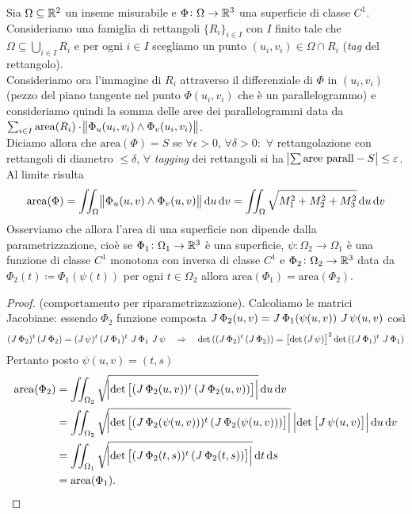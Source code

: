 \begin{definition}
	Sia $ \Omega \subseteq \mathbb{R}^2 $ un inseme misurabile e $ \Phi \colon \Omega \to \mathbb{R}^3 $ una superficie di classe $ C^1 $. Consideriamo una famiglia di rettangoli $ \{R_i\}_{i \in I} $ con $ I $ finito tale che $ \Omega \subseteq \bigcup_{i \in I} R_i $ e per ogni $ i \in I $ scegliamo un punto $ (u_i, v_i) \in \Omega \cap R_i $ (\emph{tag} del rettangolo). \\
	Consideriamo ora l'immagine di $ R_i $ attraverso il differenziale di $ \Phi $ in $ (u_i, v_i) $ (pezzo del piano tangente nel punto $ \Phi(u_i, v_i) $ che è un parallelogrammo) e consideriamo quindi la somma delle aree dei parallelogrammi data da $ \sum_{i \in I} \mathrm{area}(R_i) \cdot \norm{\Phi_u(u_i, v_i) \wedge \Phi_v(u_i, v_i)} $. \\
	Diciamo allora che $ \mathrm{area}(\Phi) = S $ se $ \forall \epsilon > 0 $, $ \forall \delta > 0 : $ $ \forall $ rettangolazione con rettangoli di diametro $ \leq \delta $, $ \forall $ \emph{tagging} dei rettangoli si ha $ \abs{\sum{\text{aree parall}} - S} \leq \varepsilon $. Al limite risulta 
	\begin{equation}
		\mathrm{area}(\Phi) = \iint_{\Omega} \norm{\Phi_u(u, v) \wedge \Phi_v(u, v)} \dif{u} \dif{v} = \iint_{\Omega} \sqrt{M_1^2 + M_2^2 + M_3^2} \dif{u} \dif{v}
	\end{equation}
	Osserviamo che allora l'area di una superficie non dipende dalla parametrizzazione, cioè se $ \Phi_1 \colon \Omega_1 \to \mathbb{R}^3 $ è una superficie, $ \psi \colon \Omega_2 \to \Omega_1 $ è una funzione di classe $ C^1 $ monotona con inversa di classe $ C^1 $ e $ \Phi_2 \colon \Omega_2 \to \mathbb{R}^3 $ data da $ \Phi_2(t) \coloneqq \Phi_1(\psi(t)) $ per ogni $ t \in \Omega_2 $ allora $ \mathrm{area}(\Phi_1) = \mathrm{area}(\Phi_2) $.
\end{definition}
%
\begin{proof}
	(comportamento per riparametrizzazione).
	Calcoliamo le matrici Jacobiane: essendo $ \Phi_2 $ funzione composta $ \operatorname{\mathit{J}}{\Phi_2}(u, v) = \operatorname{\mathit{J}}{\Phi_1}(\psi(u, v)) \, \operatorname{\mathit{J}}{\psi}(u, v) $ così
	\[
		(\operatorname{\mathit{J}}{\Phi_2})^t \, (\operatorname{\mathit{J}}{\Phi_2}) = (\operatorname{\mathit{J}}{\psi})^t \, (\operatorname{\mathit{J}}{\Phi_1})^t \, \operatorname{\mathit{J}}{\Phi_1} \, \operatorname{\mathit{J}}{\psi} \quad \Rightarrow \quad \det{((\operatorname{\mathit{J}}{\Phi_2})^t \, (\operatorname{\mathit{J}}{\Phi_2}))} = \left[\det{(\operatorname{\mathit{J}}{\psi})}\right]^2 \det{((\operatorname{\mathit{J}}{\Phi_1})^t \, \operatorname{\mathit{J}}{\Phi_1})}
	\]
	Pertanto posto $ \psi(u, v) = (t, s) $
	\begin{align*}
		\mathrm{area}(\Phi_2) & = \iint_{\Omega_2} \sqrt{\abs{\det{\left[(\jac{\Phi_2}(u, v))^t \, (\jac{\Phi_2}(u, v))\right]}}} \dif{u} \dif{v} \\
		& = \iint_{\Omega_2} \sqrt{\abs{\det{\left[(\jac{\Phi_2}(\psi(u, v)))^t \, (\jac{\Phi_2}(\psi(u, v)))\right]}}} \, \abs{\det{\left[\jac{\psi}(u, v)\right]}} \dif{u} \dif{v} \\
		& = \iint_{\Omega_1} \sqrt{\abs{\det{\left[(\jac{\Phi_2}(t, s))^t \, (\jac{\Phi_2}(t, s))\right]}}} \dif{t} \dif{s} \\
		& = \mathrm{area}(\Phi_1). \qedhere
	\end{align*}
\end{proof}

